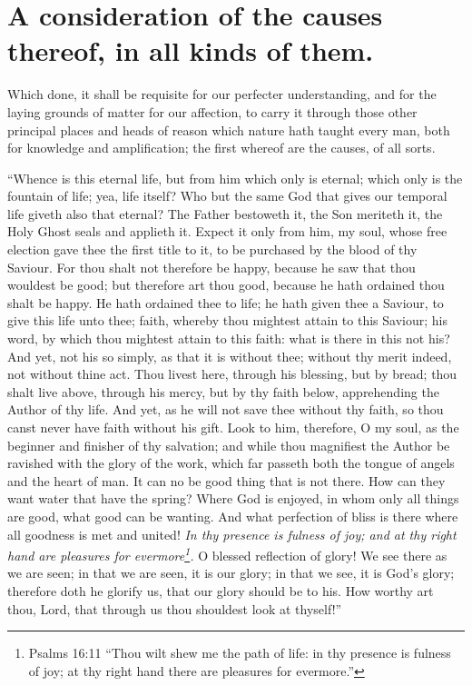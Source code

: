 \section{A consideration of the causes thereof, in all kinds of them.}
Which done, it shall be requisite for our perfecter understanding, and for the laying grounds of matter for our affection, to carry it through those other principal places and heads of reason which nature hath taught every man, both for knowledge and amplification; the first whereof are the causes, of all sorts. 

``Whence is this eternal life, but from him which only is eternal; which only is the fountain of life; yea, life itself? Who but the same God that gives our temporal life giveth also that eternal? The Father bestoweth it, the Son meriteth it, the Holy Ghost seals and applieth it. Expect it only from him, my soul, whose free election gave thee the first title to it, to be purchased by the blood of thy Saviour. For thou shalt not therefore be happy, because he saw that thou wouldest be good; but therefore art thou good, because he hath ordained thou shalt be happy. He hath ordained thee to life; he hath given thee a Saviour, to give this life unto thee; faith, whereby thou mightest attain to this Saviour; his word, by which thou mightest attain to this faith: what is there in this not his? And yet, not his so simply, as that it is without thee; without thy merit indeed, not without thine act. Thou livest here, through his blessing, but by bread; thou shalt live above, through his mercy, but by thy faith below, apprehending the Author of thy life. And yet, as he will not save thee without thy faith, so thou canst never have faith without his gift. Look to him, therefore, O my soul, as the beginner and finisher of thy salvation; and while thou magnifiest the Author be ravished with the glory of the work, which far passeth both the tongue of angels and the heart of man. It can no be good thing that is not there. How can they want water that have the spring? Where God is enjoyed, in whom only all things are good, what good can be wanting. And what perfection of bliss is there where all goodness is met and united! \emph{In thy presence is fulness of joy; and at thy right hand are pleasures for evermore\footnote{Psalms 16:11 ``Thou wilt shew me the path of life: in thy presence is fulness of joy; at thy right hand there are pleasures for evermore.''}.} O blessed reflection of glory! We see there as we are seen; in that we are seen, it is our glory; in that we see, it is God's glory; therefore doth he glorify us, that our glory should be to his. How worthy art thou, Lord, that through us thou shouldest look at thyself!''

